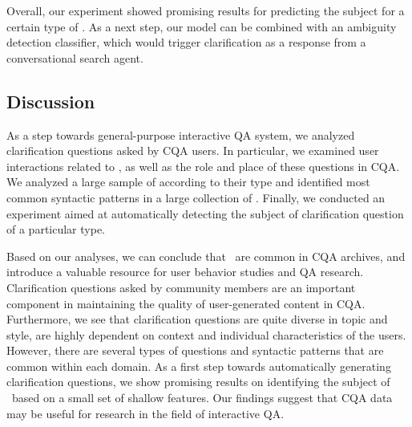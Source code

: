 Overall, our experiment showed promising results for predicting the subject for a certain type of \clarQ.
As a next step, our model can be combined with an ambiguity detection classifier, which would trigger clarification as a response from a conversational search agent.

\subsection{Discussion}
\label{section:conversation:clarq:Discussion}

As a step towards general-purpose interactive QA system, we analyzed clarification questions asked by CQA users.
In particular, we examined user interactions related to \clarQ, as well as the role and place of these questions in  CQA.
We analyzed a large sample of \clarQ according to their type and identified most common syntactic patterns in a large collection of \clarQ.
Finally, we conducted an experiment aimed at automatically detecting the subject of clarification question of a particular type.

Based on our analyses, we can conclude that \clarQ~are common in CQA archives, and introduce a valuable resource for user behavior studies and QA research.
Clarification questions asked by community members are an important component in maintaining the quality of user-generated content in CQA.
Furthermore, we see that clarification questions are quite diverse in topic and style, are highly dependent on context and individual characteristics of the users.
However, there are several types of questions and syntactic patterns that are common within each domain.
As a first step towards automatically generating clarification questions, we show promising results on identifying the subject of \clarQ~based on a small set of shallow features.
Our findings suggest that CQA data may be useful for research in the field of interactive QA.



